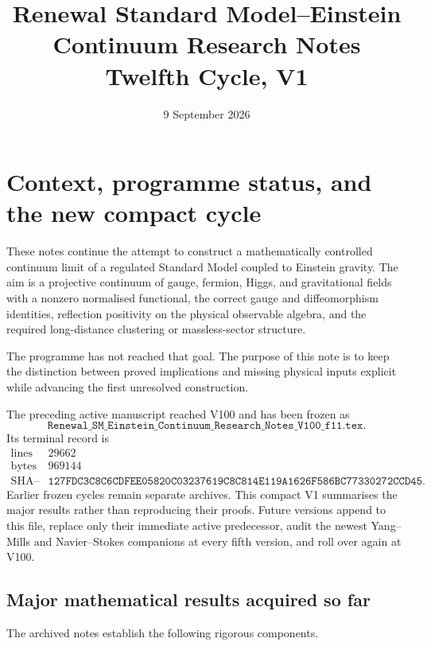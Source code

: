 \documentclass[11pt]{article}
\title{Renewal Standard Model--Einstein Continuum Research Notes\\
Twelfth Cycle, V1}
\author{}
\date{9 September 2026}
\theoremstyle{remark}
\begin{document}
\maketitle
\tableofcontents

\section{Context, programme status, and the new compact cycle}
\label{sec:v12v1}

These notes continue the attempt to construct a mathematically
controlled continuum limit of a regulated Standard Model coupled to
Einstein gravity.  The aim is a projective continuum of gauge,
fermion, Higgs, and gravitational fields with a nonzero normalised
functional, the correct gauge and diffeomorphism identities,
reflection positivity on the physical observable algebra, and the
required long-distance clustering or massless-sector structure.

The programme has not reached that goal.  The purpose of this note is
to keep the distinction between proved implications and missing
physical inputs explicit while advancing the first unresolved
construction.

The preceding active manuscript reached V100 and has been frozen as
\[
 \texttt{Renewal\_SM\_Einstein\_Continuum\_Research\_Notes\_V100\_f11.tex}.
\]
Its terminal record is
\[
\begin{array}{c|c}
\text{lines}&29662\\
\text{bytes}&969144\\
\text{SHA--256}&
\texttt{127FDC3C8C6CDFEE05820C03237619C8C814E119A1626F586BC77330272CCD45}.
\end{array}                                                     \tag{1.1}
\]
Earlier frozen cycles remain separate archives.  This compact V1
summarises the major results rather than reproducing their proofs.
Future versions append to this file, replace only their immediate
active predecessor, audit the newest Yang--Mills and Navier--Stokes
companions at every fifth version, and roll over again at V100.

\subsection{Major mathematical results acquired so far}

The archived notes establish the following rigorous components.
\end{document}
